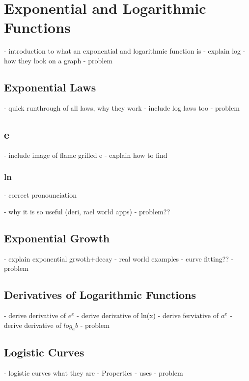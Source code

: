 \chapter{Exponential and Logarithmic Functions}
- introduction to what an exponential and logarithmic function is
- explain log
- how they look on a graph
- problem
\section{Exponential Laws}
- quick runthrough of all laws, why they work
- include log laws too
- problem
\section{e}
- include image of flame grilled e
- explain how to find
\subsection{ln}
- correct pronounciation

- why it is so useful (deri, rael world apps)
- problem??

\section{Exponential Growth}
- explain exponential grwoth+decay
- real world examples
- curve fitting??
- problem

\section{Derivatives of Logarithmic Functions}
- derive derivative of $e^x$
- derive derivative of ln(x)
- derive ferviative of $a^x$
- derive derivative of $log_a{b}$
- problem

\begin{subappendices}
    \section{Logistic Curves}
    - logistic curves what they are
    - Properties
    - uses 
    - problem
\end{subappendices}